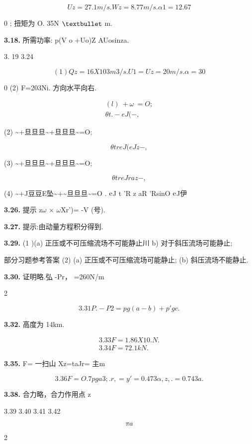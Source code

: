 \[Uz =27. 1m/s. Wz =8. 77m/s.\alpha 1=12.67\]

0 ; 扭矩为 O. 35N ${\rm •}$ m.

\noindent\textbf{3.18.} 所需功率: p(V o +Uo)Z AUosinza.

3. 19 3.24

\[(1) Qz=16X10 3 m3/ s .U 1 =Uz =20m/s. \alpha =30\]

0 (2) F=203Ni. 方向水平向右.

\begin{gather*}
(l )~+\omega ~=O;\\
\theta  t . - eJ( - ,
\end{gather*}

(2) \textasciitilde{}+旦旦旦\textasciitilde{}+旦旦旦\textasciitilde{}=O;

\[\theta  t reJ( eJ z -,\]

(3) \textasciitilde{}+旦旦旦\textasciitilde{}+旦旦旦\textasciitilde{}=O;

\[\theta  t reJ r az -,\]

(4) \textasciitilde{}+J豆豆E坠\textasciitilde{}+\textasciitilde{}旦旦旦\textasciitilde{}=O . ${\rm e}$J t 'R z aR 'RsinO ${\rm e}$J伊

\noindent\textbf{3.26.} 提示 z$\omega$ $\times $ $\omega$Xr')= -V (号).

\noindent\textbf{3.27.} 提示:由动量方程积分得到.

\noindent\textbf{3.29.} (1 )(a) 正压或不可压缩流场不可能静止川 b) 对于斜压流场可能静止;

部分习题参考答案 (2) (a) 正压或不可压缩流场可能静止; (b) 斜压流场不能静止.

\noindent\textbf{3.30.} 证明略.弘 -Pr， =260N/m

2

\[3.31 P. - P2 =pg(a-b) +p'gc.\]

\noindent\textbf{3.32.} 高度为 14km.

\begin{gather*}
3.33 F= 1. 86 X 10. N.\\
3.34 F=72.1kN.
\end{gather*}

\noindent\textbf{3.35.} F= 一扫山 Xz=taJr= 主m

\[3.36 F=O. 7 pga3 ;.r, = y' =0.473\alpha  ,  z ,  . =0.743a.\]

\noindent\textbf{3.38.} 合力略，合力作用点 z

3.39 3.40 3.41 3.42

\[\pi a\]

2

